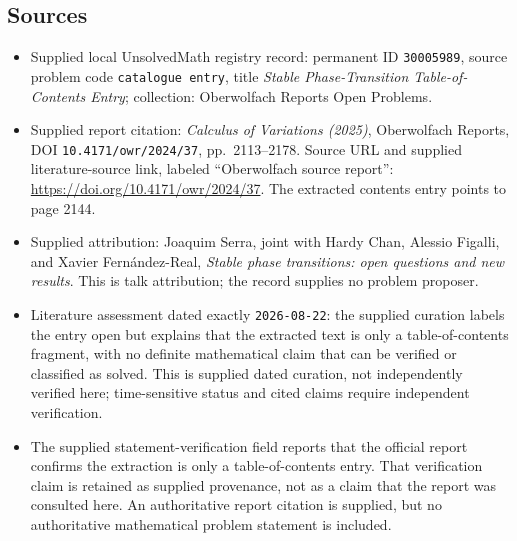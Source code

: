 \documentclass[11pt]{article}
\begin{document}
\subsection{Sources}
\begin{itemize}
\item Supplied local UnsolvedMath registry record: permanent ID \texttt{30005989}, source problem code \texttt{catalogue entry}, title \emph{Stable Phase-Transition Table-of-Contents Entry}; collection: Oberwolfach Reports Open Problems.
\item Supplied report citation: \emph{Calculus of Variations (2025)}, Oberwolfach Reports, DOI \texttt{10.4171/owr/2024/37}, pp.\ 2113--2178. Source URL and supplied literature-source link, labeled ``Oberwolfach source report'': \url{https://doi.org/10.4171/owr/2024/37}. The extracted contents entry points to page 2144.
\item Supplied attribution: Joaquim Serra, joint with Hardy Chan, Alessio Figalli, and Xavier Fern\'andez-Real, \emph{Stable phase transitions: open questions and new results}. This is talk attribution; the record supplies no problem proposer.
\item Literature assessment dated exactly \texttt{2026-08-22}: the supplied curation labels the entry open but explains that the extracted text is only a table-of-contents fragment, with no definite mathematical claim that can be verified or classified as solved. This is supplied dated curation, not independently verified here; time-sensitive status and cited claims require independent verification.
\item The supplied statement-verification field reports that the official report confirms the extraction is only a table-of-contents entry. That verification claim is retained as supplied provenance, not as a claim that the report was consulted here. An authoritative report citation is supplied, but no authoritative mathematical problem statement is included.
\end{itemize}
\end{document}

